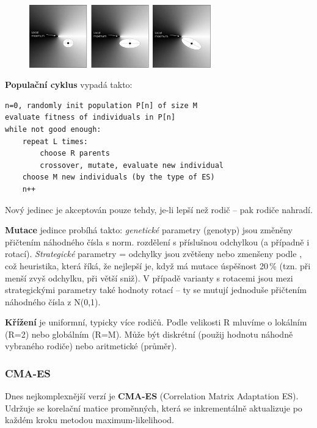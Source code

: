 \begin{figure}[h]
	\centering
\includegraphics[width=0.7\textwidth]{img/ES_varianty_k.jpg}
\end{figure}

\textbf{Populační cyklus} vypadá takto:
\medskip

\begin{minipage}{\linewidth}
	\begin{lstlisting}[frame=single]
n=0, randomly init population P[n] of size M
evaluate fitness of individuals in P[n]
while not good enough:
	repeat L times:
		choose R parents
		crossover, mutate, evaluate new individual
	choose M new individuals (by the type of ES)
	n++
	\end{lstlisting}
\end{minipage}

Nový jedinec je akceptován pouze tehdy, je-li lepší než rodič -- pak rodiče nahradí.

\textbf{Mutace} jedince probíhá takto: \textit{genetické} parametry (genotyp) jsou změněny přičtením náhodného čísla s norm. rozdělení s příslušnou odchylkou (a případně i rotací). \textit{Strategické} parametry = odchylky jsou zvětšeny nebo zmenšeny podle , což heuristika, která říká, že nejlepší je, když má mutace úspěšnost 20\,\% (tzn. při menší zvyš odchylku, při větší sniž). V případě varianty s rotacemi jsou mezi strategickými parametry také hodnoty rotací -- ty se mutují jednoduše přičtením náhodného čísla z N(0,1).

\textbf{Křížení} je uniformní, typicky více rodičů. Podle velikosti R mluvíme o lokálním (R=2) nebo globálním (R=M). Může být diskrétní (použij hodnotu náhodně vybraného rodiče) nebo aritmetické (průměr).

\subsubsection{CMA-ES}
Dnes nejkomplexnější verzí je \textbf{CMA-ES} (Correlation Matrix Adaptation ES). Udržuje se korelační matice proměnných, která se inkrementálně aktualizuje po každém kroku metodou maximum-likelihood.

